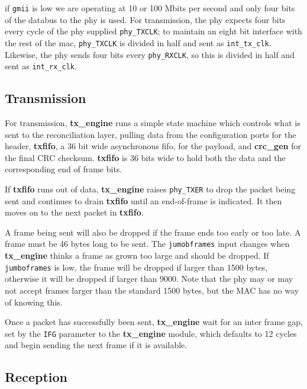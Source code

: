 \documentclass[11pt]{article}
\begin{document}
if \texttt{gmii} is low we are operating at 10 or 100 Mbits per second
and only four bits of the databus to the phy is used.  For
transmission, the phy expects four bits every cycle of the phy
supplied \texttt{phy\_TXCLK}; to maintain an eight bit interface with
the rest of the mac, \texttt{phy\_TXCLK} is divided in half and sent
as \texttt{int\_tx\_clk}.  Likewise, the phy sends four bits every
\texttt{phy\_RXCLK}, so this is divided in half and sent as
\texttt{int\_rx\_clk}.

\subsection{Transmission}

For transmission, \textbf{tx\_engine} runs a simple state machine
which controls what is sent to the reconciliation layer, pulling data
from the configuration ports for the header, \textbf{txfifo}, a 36 bit
wide asynchronous fifo, for the payload, and \textbf{crc\_gen} for the
final CRC checksum.  \textbf{txfifo} is 36 bits wide to hold both the
data and the corresponding end of frame bits.

If \textbf{txfifo} runs out of data, \textbf{tx\_engine} raises
\texttt{phy\_TXER} to drop the packet being sent and continues to
drain \textbf{txfifo} until an end-of-frame is indicated.  It then
moves on to the next packet in \textbf{txfifo}.

A frame being sent will also be dropped if the frame ends too early or
too late.  A frame must be 46 bytes long to be sent. The
\texttt{jumobframes} input changes when \textbf{tx\_engine} thinks a
frame as grown too large and should be dropped.  If
\texttt{jumboframes} is low, the frame will be dropped if larger than
1500 bytes, otherwise it will be dropped if larger than 9000. Note
that the phy may or may not accept frames larger than the standard
1500 bytes, but the MAC has no way of knowing this.

Once a packet has successfully been sent, \textbf{tx\_engine} wait for
an inter frame gap, set by the \texttt{IFG} parameter to the
\textbf{tx\_engine} module, which defaults to 12 cycles and begin
sending the next frame if it is available.

\subsection{Reception}
\end{document}
